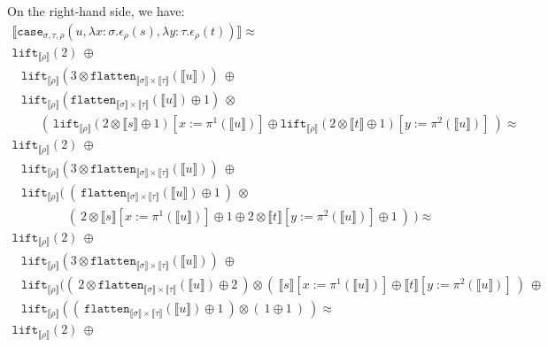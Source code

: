 \documentclass[a4paper,UKenglish,cleveref,autoref,numberwithinsect]{lipics-v2019}
\theoremstyle{definition}
\newcommand{\abs}[2]{\lambda #1.#2}
\newcommand{\flatten}{\mathtt{flatten}}
\newcommand{\lift}{\mathtt{lift}}
\newcommand{\typeinterpret}[1]{\llbracket #1 \rrbracket}
\newcommand{\interpret}[1]{\llbracket #1 \rrbracket}
\begin{document}
\begin{itemize}
  On the right-hand side, we have:
  \[
  \begin{array}{l}
  \interpret{\mathtt{case}_{\sigma,\tau,\rho}(u,
  \abs{x:\sigma}{\epsilon_\rho(s)},\abs{y:\tau}{\epsilon_\rho(t)})}
  \approx \\
  \lift_{\typeinterpret{\rho}}(2)\ \oplus \\
  \phantom{A}
  \lift_{\typeinterpret{\rho}}(3 \otimes \flatten_{\typeinterpret{
    \sigma} \times \typeinterpret{\tau}}(\interpret{u}))\ \oplus \\
  \phantom{A}
  \lift_{\typeinterpret{\rho}}(\flatten_{\typeinterpret{\sigma} \times
    \typeinterpret{\tau}}(\interpret{u}) \oplus 1)\ \otimes \\
  \phantom{ABC}
    (\ \lift_{\typeinterpret{\rho}}(2 \otimes \interpret{s} \oplus 1)
      [x:=\pi^1(\interpret{u})]
      \oplus
     \lift_{\typeinterpret{\rho}}(2 \otimes \interpret{t} \oplus 1)
      [y:=\pi^2(\interpret{u})]
    \ ) \approx \\
  \lift_{\typeinterpret{\rho}}(2)\ \oplus \\
  \phantom{A}
  \lift_{\typeinterpret{\rho}}(3 \otimes \flatten_{\typeinterpret{
    \sigma} \times \typeinterpret{\tau}}(\interpret{u}))\ \oplus \\
  \phantom{A}
  \lift_{\typeinterpret{\rho}}(\ (\ \flatten_{\typeinterpret{\sigma} \times
    \typeinterpret{\tau}}(\interpret{u}) \oplus 1\ )\ \otimes \\
  \phantom{ABCDEF}
    (\ 2 \otimes \interpret{s}[x:=\pi^1(\interpret{u})] \oplus 1
       \oplus
       2 \otimes \interpret{t}[y:=\pi^2(\interpret{u})] \oplus 1
    \ )\ ) \approx \\
  \lift_{\typeinterpret{\rho}}(2)\ \oplus \\
  \phantom{A}
  \lift_{\typeinterpret{\rho}}(3 \otimes \flatten_{\typeinterpret{
    \sigma} \times \typeinterpret{\tau}}(\interpret{u}))\ \oplus \\
  \phantom{A}
  \lift_{\typeinterpret{\rho}}((\ 2 \otimes \flatten_{\typeinterpret{
    \sigma} \times \typeinterpret{\tau}}(\interpret{u}) \oplus 2\ )
    \otimes (\ \interpret{s}[x:=\pi^1(\interpret{u})] \oplus
    \interpret{t}[y:=\pi^2(\interpret{u})]\ )\ \oplus \\
  \phantom{A}
  \lift_{\typeinterpret{\rho}}((\ \flatten_{\typeinterpret{\sigma} \times
    \typeinterpret{\tau}}(\interpret{u}) \oplus 1\ ) \otimes 
    (\ 1 \oplus 1\ )\ ) \approx \\
  \lift_{\typeinterpret{\rho}}(2)\ \oplus \\

\end{array}\]
\end{itemize}
\end{document}
